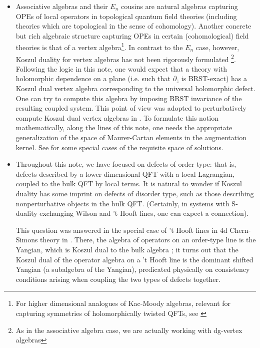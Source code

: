 \documentclass[11pt]{amsart}
\begin{document}
\begin{itemize}
\item Associative algebras and their $E_n$ cousins are natural algebras capturing OPEs of local operators in topological quantum field theories (including theories which are topological in the sense of cohomology).  Another concrete but rich algebraic structure capturing OPEs in certain (cohomological) field theories is that of a vertex algebra\footnote{For higher dimensional analogues of Kac-Moody algebras, relevant for capturing symmetries of holomorphically twisted QFTs, see \cite{GW}}. In contrast to the $E_n$ case, however, Koszul duality for vertex algebras has not been rigorously formulated \footnote{As in the associative algebra case, we are actually working with dg-vertex algebras}. Following the logic in this note, one would expect that a theory with holomorphic dependence on a plane (i.e. such that $\partial_{\bar{z}}$ is BRST-exact) has a Koszul dual vertex algebra corresponding to the universal holomorphic defect. One can try to compute this algebra by imposing BRST invariance of the resulting coupled system. This point of view was adopted to perturbatively compute Koszul dual vertex algebras in \cite{CP}. To formulate this notion mathematically, along the lines of this note, one needs the appropriate generalization of the space of Maurer-Cartan elements in the augmentation kernel. See \cite{Li} for some special cases of the requisite space of solutions.  

\item Throughout this note, we have focused on defects of order-type: that is, defects described by a lower-dimensional QFT with a local Lagrangian, coupled to the bulk QFT by local terms. It is natural to wonder if Koszul duality has some imprint on defects of disorder type, such as those describing nonperturbative objects in the bulk QFT. (Certainly, in systems with S-duality exchanging Wilson and 't Hooft lines, one can expect a connection). 

This question was answered in the special case of 't Hooft lines in 4d Chern-Simons theory in \cite{CGY}. There, the algebra of operators on an order-type line is the Yangian, which is Koszul dual to the bulk algebra \cite{CYangian}; it turns out that the Koszul dual of the operator algebra on a 't Hooft line is the dominant shifted Yangian (a subalgebra of the Yangian), predicated physically on consistency conditions arising when coupling the two types of defects together. 


\end{itemize}
\end{document}
